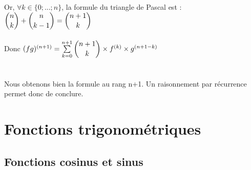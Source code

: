 \documentclass[a4paper,10pt]{book}
\begin{document}
Or, $\forall k \in \{0;...;n\}$, la formule du triangle de Pascal est : $\dbinom{n}{k}+\dbinom{n}{k-1}=\dbinom{n+1}{k}$\\\\
Donc $(fg)^{(n+1)}=\sum \limits_{k=0}^{n+1}{}\dbinom{n+1}{k}\times f^{(k)}\times g^{(n+1-k)}$
\\\\\\
Nous obtenons bien la formule au rang n+1. Un raisonnement par récurrence permet donc de conclure.\\

\newpage

\section{Fonctions trigonométriques}
\subsection{Fonctions cosinus et sinus}
\end{document}
